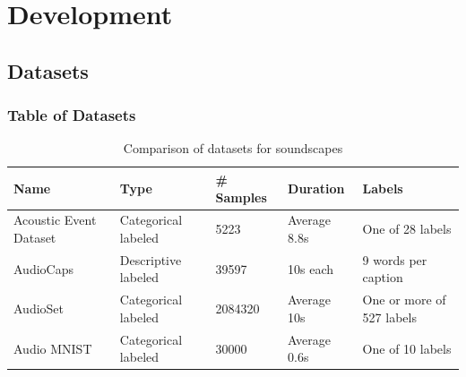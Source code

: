 \section{Development}

\subsection{Datasets}

\begin{frame}
    \frametitle{Table of Datasets}

    \begin{table}[ht]
        \centering
        \caption{Comparison of datasets for soundscapes}
        \label{tab:datasets}
        \begin{tabularx}{\textwidth}{|X|X|X|X|X|}
            \hline
            \textbf{Name}                                     &
            \textbf{Type}                                     &
            \textbf{\# Samples}                               &
            \textbf{Duration}                                 &
            \textbf{Labels}                                     \\ \hline

            Acoustic Event Dataset \cite{takahashi_deep_2016} &
            Categorical labeled                               &
            5223                                              &
            Average 8.8s                                      &
            One of 28 labels                                    \\ \hline

            AudioCaps \cite{kim_audiocaps_2019}               &
            Descriptive labeled                               &
            39597                                             &
            10s each                                          &
            9 words per caption                                 \\ \hline

            AudioSet \cite{gemmeke_audio_2017}                &
            Categorical labeled                               &
            2084320                                           &
            Average 10s                                       &
            One or more of 527 labels                           \\ \hline

            Audio MNIST~\cite{becker_interpreting_2018}       &
            Categorical labeled                               &
            30000                                             &
            Average 0.6s                                      &
            One of 10 labels                                    \\ \hline
        \end{tabularx}
    \end{table}
\end{frame}

